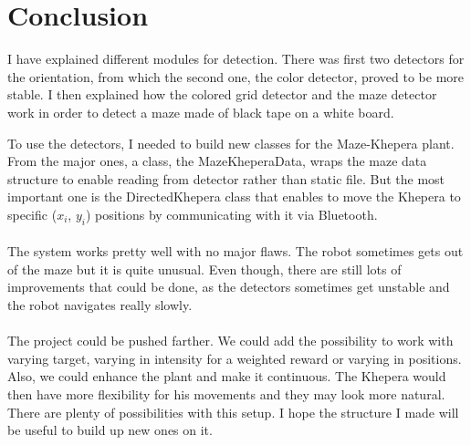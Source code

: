 \chapter{Conclusion}
\label{sec:conclusion}

I have explained different modules for detection. There was first two 
detectors for the orientation, from which the second one, the color 
detector, proved to be more stable. I then explained how the colored 
grid detector and the maze detector work in order to detect a maze made 
of black tape on a white board.

To use the detectors, I needed to build new classes for the Maze-Khepera 
plant. From the major ones, a class, the MazeKheperaData, wraps the 
maze data structure to enable reading from detector rather than static 
file. But the most important one is the DirectedKhepera class that 
enables to move the Khepera to specific ($x_i$, $y_i$) positions by 
communicating with it via Bluetooth. 
\\
\\
The system works pretty well with no major flaws. The robot sometimes 
gets out of the maze but it is quite unusual. Even though, there are 
still lots of improvements that could be done, as the detectors sometimes 
get unstable and the robot navigates really slowly. 
\\
\\
The project could be pushed farther. We could add the possibility to 
work with varying target, varying in intensity for a weighted reward or 
varying in positions. Also, we could enhance the plant and make it 
continuous. The Khepera would then have more flexibility for his 
movements and they may look more natural. There are plenty of 
possibilities with this setup. I hope the structure I made will be 
useful to build up new ones on it. 
